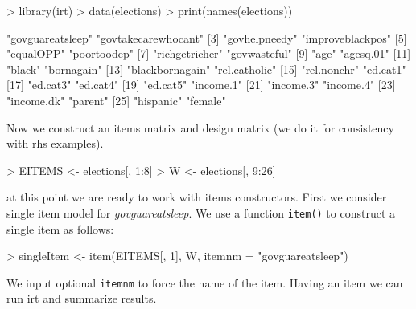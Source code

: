 \documentclass{amsart}
\begin{document}
\begin{Schunk}
\begin{Sinput}
> library(irt)
> data(elections)
> print(names(elections))
\end{Sinput}
\begin{Soutput}
 [1] "govguareatsleep"    "govtakecarewhocant"
 [3] "govhelpneedy"       "improveblackpos"   
 [5] "equalOPP"           "poortoodep"        
 [7] "richgetricher"      "govwasteful"       
 [9] "age"                "agesq.01"          
[11] "black"              "bornagain"         
[13] "blackbornagain"     "rel.catholic"      
[15] "rel.nonchr"         "ed.cat1"           
[17] "ed.cat3"            "ed.cat4"           
[19] "ed.cat5"            "income.1"          
[21] "income.3"           "income.4"          
[23] "income.dk"          "parent"            
[25] "hispanic"           "female"            
\end{Soutput}
\end{Schunk}
Now we construct an items matrix and design matrix (we do it for consistency with rhs examples).

\begin{Schunk}
\begin{Sinput}
> EITEMS <- elections[, 1:8]
> W <- elections[, 9:26]
\end{Sinput}
\end{Schunk}
at this point we are ready to work with items constructors. First we consider single item model for {\it govguareatsleep}.
We use a function {\tt item()} to construct a single item as follows:
\begin{Schunk}
\begin{Sinput}
> singleItem <- item(EITEMS[, 1], W, itemnm = "govguareatsleep")
\end{Sinput}
\end{Schunk}
We input optional {\tt itemnm} to force the name of the item. Having an item we can run irt and summarize results.
\end{document}

